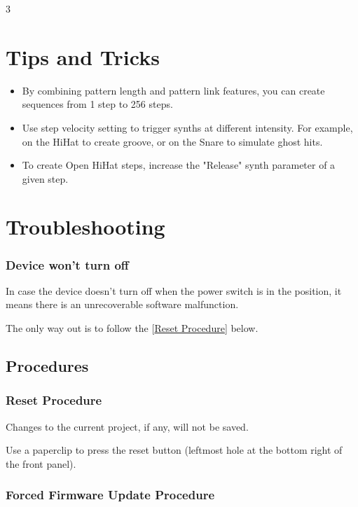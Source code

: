 \documentclass[8pt]{extarticle}
\newcommand{\reflabel}[2]{
[\hyperref[#1]{#2}]
}
\begin{document}
\begin{multicols*}{3}
\section{Tips and Tricks}

\begin{itemize}
    \item By combining pattern length and pattern link features, you can create sequences from 1 step to 256 steps.

    \item Use step velocity setting to trigger synths at different intensity. For example, on the HiHat to create groove, or on the Snare to simulate ghost hits.

    \item To create Open HiHat steps, increase the "Release" synth parameter of a given step.
\end{itemize}

\section{Troubleshooting}

\subsubsection{Device won't turn off}

In case the device doesn't turn off when the power switch is in the  position, it means there is an unrecoverable software malfunction.

The only way out is to follow the \reflabel{procedures:reset}{Reset Procedure} below.

\subsection{Procedures}

\subsubsection{Reset Procedure}
\label{procedures:reset}

\begin{important}
Changes to the current project, if any, will not be saved.
\end{important}

Use a paperclip to press the reset button (leftmost hole at the bottom right of the front panel).

\subsubsection{Forced Firmware Update Procedure}
\label{procedures:forced_firmware_update}


\end{multicols*}
\end{document}
